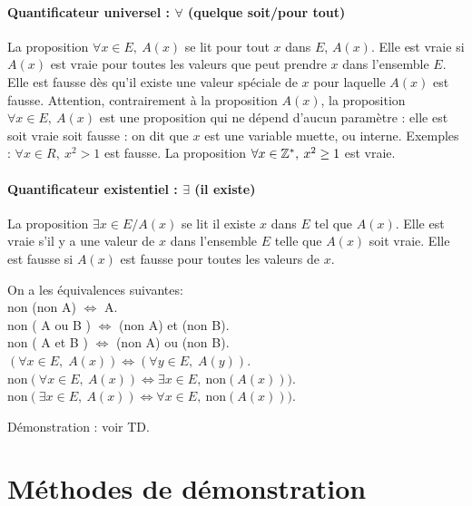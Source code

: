 {\paragraph{Quantificateur universel : $\forall$ (quelque soit/pour tout)}$ $\\
La proposition \og$\forall x\in E,\:A(x)$\fg{} se lit \og pour tout $x$ dans $E$, $A(x)$\fg. Elle est vraie si $A(x)$ est vraie pour toutes les valeurs que peut prendre $x$ dans l'ensemble $E$. Elle est fausse dès qu'il existe une valeur spéciale de $x$ pour laquelle $A(x)$ est fausse.
Attention, contrairement à la proposition $A(x)$, la proposition $\forall x\in E,\:A(x)$ est une proposition qui ne dépend d'aucun paramètre : elle est soit vraie soit fausse : on dit que $x$ est une variable muette, ou interne.
Exemples :  $\forall x\in R,\: x^2>1$ est fausse. La proposition $\forall x\in \mathbb{Z}^*,\: x^2\geq 1$ est vraie.

\paragraph{Quantificateur existentiel : $\exists$ (il existe)}$ $\\
La proposition \og$\exists x\in E\slash A(x)$\fg{} se lit \og il existe $x$ dans $E$ tel que $A(x)$\fg. Elle est vraie s'il y a une valeur de $x$ dans l'ensemble $E$ telle que $A(x)$ soit vraie. Elle est fausse si $A(x)$ est fausse pour toutes les valeurs de $x$.



\begin{theoreme} On a les équivalences suivantes:\\
non (non A) $\Leftrightarrow$ A.\\
non ( A ou B ) $\Leftrightarrow$ (non A) et (non B).\\
non ( A et B ) $\Leftrightarrow$ (non A) ou (non B).\\
$(\forall x\in E,\; A(x))\Leftrightarrow (\forall y\in E,\; A(y))$.\\
$\text{non}(\forall x\in E,\: A(x)) \Leftrightarrow \exists x\in E,\: \text{non}(A(x)))$.\\
$\text{non}(\exists x\in E,\: A(x)) \Leftrightarrow \forall x\in E,\: \text{non}(A(x)))$.
\end{theoreme}

Démonstration : voir TD.

\section{Méthodes de démonstration}


}
